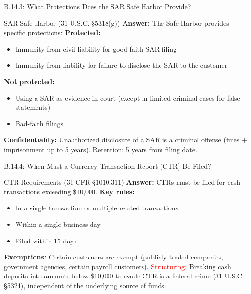 \documentclass{beamer}
\begin{document}
	\begin{frame}{B.14.3: What Protections Does the SAR Safe Harbor Provide?}
		\begin{block}{SAR Safe Harbor (31 U.S.C. \S5318(g))}
			\textbf{Answer:} The Safe Harbor provides specific protections:
			\vspace{0.2cm}
			\textbf{Protected:}
			\begin{itemize}
				\item Immunity from civil liability for good-faith SAR filing
				\item Immunity from liability for failure to disclose the SAR to the customer
			\end{itemize}
			\textbf{Not protected:}
			\begin{itemize}
				\item Using a SAR as evidence in court (except in limited criminal cases for false statements)
				\item Bad-faith filings
			\end{itemize}
			\textbf{Confidentiality:} Unauthorized disclosure of a SAR is a criminal offense (fines + imprisonment up to 5 years). Retention: 5 years from filing date.
		\end{block}
	\end{frame}
	
	\begin{frame}{B.14.4: When Must a Currency Transaction Report (CTR) Be Filed?}
		\begin{block}{CTR Requirements (31 CFR \S1010.311)}
			\textbf{Answer:} CTRs must be filed for cash transactions exceeding \$10,000.
			\vspace{0.2cm}
			\textbf{Key rules:}
			\begin{itemize}
				\item In a single transaction or multiple related transactions
				\item Within a single business day
				\item Filed within 15 days
			\end{itemize}
			\textbf{Exemptions:} Certain customers are exempt (publicly traded companies, government agencies, certain payroll customers).
			\vspace{0.2cm}
			\textcolor{red}{Structuring:} Breaking cash deposits into amounts below \$10,000 to evade CTR is a federal crime (31 U.S.C. \S5324), independent of the underlying source of funds.
		\end{block}
	\end{frame}
	
\end{document}

